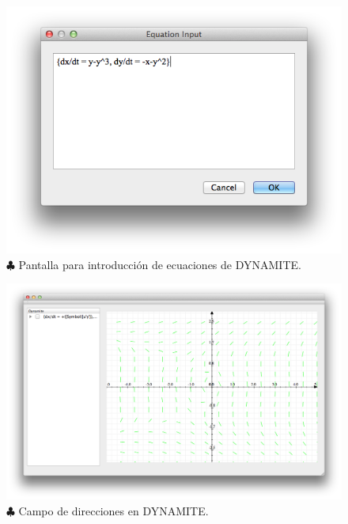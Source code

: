\begin{figure} \centering
	\includegraphics[scale=0.5]{figures/dynamite-eq1.png}
	\caption{$\clubsuit$ Pantalla para introducción de ecuaciones de DYNAMITE.}
	\label{fig:dynamite-formula1}
\end{figure}

\begin{figure} \centering
	\includegraphics[scale=0.4]{figures/dynamite-fplot.png}
	\caption{$\clubsuit$ Campo de direcciones en DYNAMITE.}
	\label{fig:dynamite-fplot}
\end{figure}

